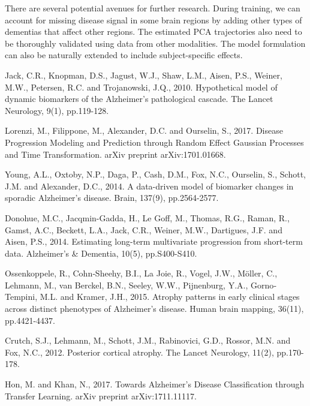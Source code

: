 \documentclass{llncs}
\begin{document}
There are several potential avenues for further research. During training, we can account for missing disease signal in some brain regions by adding other types of dementias that affect other regions. The estimated PCA trajectories also need to be thoroughly validated using data from other modalities. The model formulation can also be naturally extended to include subject-specific effects.

%


\begin{thebibliography}{5}

Jack, C.R., Knopman, D.S., Jagust, W.J., Shaw, L.M., Aisen, P.S., Weiner, M.W., Petersen, R.C. and Trojanowski, J.Q., 2010. Hypothetical model of dynamic biomarkers of the Alzheimer's pathological cascade. The Lancet Neurology, 9(1), pp.119-128.

Lorenzi, M., Filippone, M., Alexander, D.C. and Ourselin, S., 2017. Disease Progression Modeling and Prediction through Random Effect Gaussian Processes and Time Transformation. arXiv preprint arXiv:1701.01668.

Young, A.L., Oxtoby, N.P., Daga, P., Cash, D.M., Fox, N.C., Ourselin, S., Schott, J.M. and Alexander, D.C., 2014. A data-driven model of biomarker changes in sporadic Alzheimer's disease. Brain, 137(9), pp.2564-2577.

Donohue, M.C., Jacqmin-Gadda, H., Le Goff, M., Thomas, R.G., Raman, R., Gamst, A.C., Beckett, L.A., Jack, C.R., Weiner, M.W., Dartigues, J.F. and Aisen, P.S., 2014. Estimating long-term multivariate progression from short-term data. Alzheimer's \& Dementia, 10(5), pp.S400-S410.

Ossenkoppele, R., Cohn‐Sheehy, B.I., La Joie, R., Vogel, J.W., Möller, C., Lehmann, M., van Berckel, B.N., Seeley, W.W., Pijnenburg, Y.A., Gorno‐Tempini, M.L. and Kramer, J.H., 2015. Atrophy patterns in early clinical stages across distinct phenotypes of Alzheimer's disease. Human brain mapping, 36(11), pp.4421-4437.

Crutch, S.J., Lehmann, M., Schott, J.M., Rabinovici, G.D., Rossor, M.N. and Fox, N.C., 2012. Posterior cortical atrophy. The Lancet Neurology, 11(2), pp.170-178.

Hon, M. and Khan, N., 2017. Towards Alzheimer's Disease Classification through Transfer Learning. arXiv preprint arXiv:1711.11117.


\end{thebibliography}

\clearpage
\end{document}
